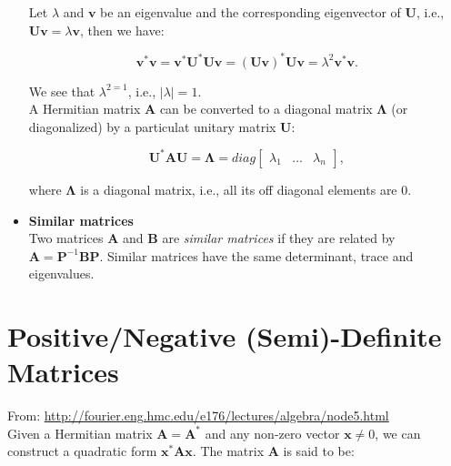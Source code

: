\documentclass[10pt,b5paper,titlepage]{book}
\begin{document}
\begin{itemize}
        Let $\lambda$ and $\mathbf{v}$ be an eigenvalue and the corresponding
        eigenvector of $\mathbf{U}$, i.e., $\mathbf{U}\mathbf{v} = \lambda\mathbf{v}$,
        then we have:

        \begin{equation}
            \mathbf{v}^{*}\mathbf{v}
            = \mathbf{v}^{*}\mathbf{U}^{*}\mathbf{U}\mathbf{v}
            = (\mathbf{U}\mathbf{v})^{*}\mathbf{U}\mathbf{v}
            = \lambda^{2}\mathbf{v}^{*}\mathbf{v}
        .\end{equation}

        We see that $\lambda^{2 = 1}$, i.e., $|\lambda| = 1$.\\

        A Hermitian matrix $\mathbf{A}$ can be converted to a diagonal
        matrix $\mathbf{\Lambda}$ (or diagonalized) by a particulat unitary
        matrix $\mathbf{U}$:

        \begin{equation}
            \mathbf{U}^{*}\mathbf{A}\mathbf{U} = \mathbf{\Lambda}
            = diag \begin{bmatrix} \lambda_1 & \ldots & \lambda_n \end{bmatrix}
        ,\end{equation}

        where $\mathbf{\Lambda}$ is a diagonal matrix, i.e., all its off diagonal
        elements are 0.

    \item \textbf{Similar matrices}\\

        Two matrices $\mathbf{A}$ and $\mathbf{B}$ are \textit{similar matrices}
        if they are related by $\mathbf{A} = \mathbf{P}^{-1}\mathbf{B}\mathbf{P}$.
        Similar matrices have the same determinant, trace and eigenvalues.

\end{itemize}



\chapter{Positive/Negative (Semi)-Definite Matrices}

From: \url{http://fourier.eng.hmc.edu/e176/lectures/algebra/node5.html}\\

Given a Hermitian matrix $\mathbf{A} = \mathbf{A}^{*}$ and any non-zero
vector $\mathbf{x} \neq 0$, we can construct a quadratic form
$\mathbf{x}^{*}\mathbf{A}\mathbf{x}$. The matrix $\mathbf{A}$ is said to be:
\end{document}
